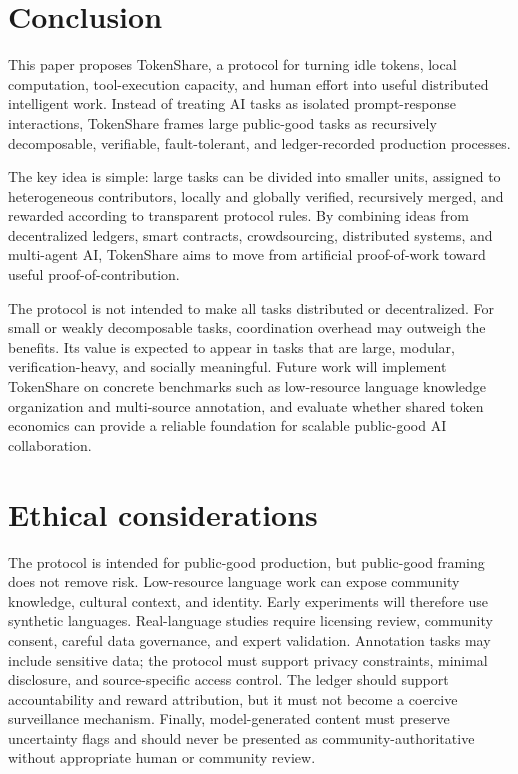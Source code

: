 \documentclass{article}
\theoremstyle{plain}
\begin{document}
\section{Conclusion}

This paper proposes TokenShare, a protocol for turning idle tokens, local computation, tool-execution capacity, and human effort into useful distributed intelligent work. Instead of treating AI tasks as isolated prompt-response interactions, TokenShare frames large public-good tasks as recursively decomposable, verifiable, fault-tolerant, and ledger-recorded production processes.

The key idea is simple: large tasks can be divided into smaller units, assigned to heterogeneous contributors, locally and globally verified, recursively merged, and rewarded according to transparent protocol rules. By combining ideas from decentralized ledgers, smart contracts, crowdsourcing, distributed systems, and multi-agent AI, TokenShare aims to move from artificial proof-of-work toward useful proof-of-contribution.

The protocol is not intended to make all tasks distributed or decentralized. For small or weakly decomposable tasks, coordination overhead may outweigh the benefits. Its value is expected to appear in tasks that are large, modular, verification-heavy, and socially meaningful. Future work will implement TokenShare on concrete benchmarks such as low-resource language knowledge organization and multi-source annotation, and evaluate whether shared token economics can provide a reliable foundation for scalable public-good AI collaboration.


\section*{Ethical considerations}

The protocol is intended for public-good production, but public-good framing does not remove risk. Low-resource language work can expose community knowledge, cultural context, and identity. Early experiments will therefore use synthetic languages. Real-language studies require licensing review, community consent, careful data governance, and expert validation. Annotation tasks may include sensitive data; the protocol must support privacy constraints, minimal disclosure, and source-specific access control. The ledger should support accountability and reward attribution, but it must not become a coercive surveillance mechanism. Finally, model-generated content must preserve uncertainty flags and should never be presented as community-authoritative without appropriate human or community review.
\end{document}
